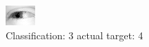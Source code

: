 \begin{figure}[h!]
\begin{center}
\includegraphics[width=0.60\columnwidth]{figures/ID2439_class_3_target_4.png}
\end{center}
\caption{ Classification: 3 actual target: 4}
\label{fig:ID2439_class_3_target_4}
\end{figure}

